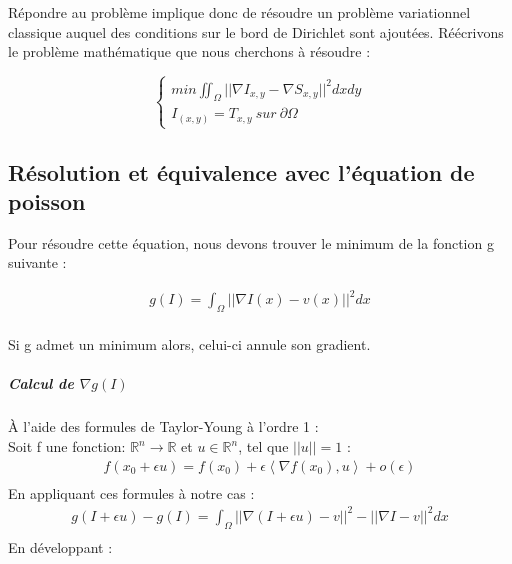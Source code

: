 Répondre au problème implique donc de résoudre un problème variationnel classique auquel des conditions sur le bord de Dirichlet sont ajoutées. 
Réécrivons le problème mathématique que nous cherchons à résoudre :  

\begin{center}
\begin{equation}
\left\{
\begin{aligned}
 min \iint_\Omega || \nabla I_{x,y} - \nabla S_{x,y}||^2 dxdy\\
 I_{(x,y)} = T_{x,y} \ sur\ \partial \Omega
\end{aligned}
\right.
\end{equation}
\end{center}


\subsection{Résolution et équivalence avec l'équation de poisson}
Pour résoudre cette équation, nous devons trouver le minimum de la fonction g suivante  : 
\begin{center}
\begin{equation}
\begin{aligned}
g(I) = \int_\Omega || \nabla I(x) - v(x)||^2 dx\\
\end{aligned}
\end{equation}
\end{center}
Si g admet un minimum alors, celui-ci annule son gradient. 
\subparagraph{Calcul de $\nabla g(I)$ }
À l'aide des formules de Taylor-Young à l'ordre 1 :\\
Soit f une fonction: $\mathbb{R}^n\rightarrow \mathbb{R}$ et $u \in \mathbb{R}^n$, tel que $||u||=1$ :
\begin{equation*}
\begin{aligned}
f(x_0+\epsilon u) = f(x_0) +\epsilon \left<\nabla f(x_0), u\right> + o(\epsilon)\\
\end{aligned}
\end{equation*}
En appliquant ces formules à notre cas :
\begin{equation*} 
\begin{aligned}
    g(I+\epsilon u) -g(I) =  \int_\Omega || \nabla (I+\epsilon u) - v||^2 - ||\nabla I -v ||^2 dx\\
\end{aligned}
\end{equation*}
En  développant : 
